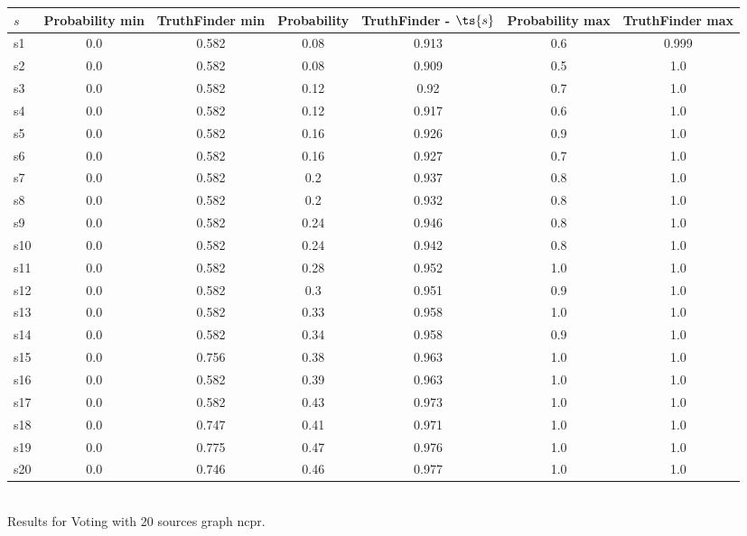 \documentclass{article}
\begin{document}
\noindent\begin{tabular}{|l|c|c|c|c|c|c|}
\hline
$s$& Probability min & TruthFinder min & Probability & TruthFinder - $\ts{s}$ & Probability max & TruthFinder max\\
\hline
s1 &0.0 & 0.582 & 0.08 & 0.913 & 0.6 & 0.999\\
\hline
s2 &0.0 & 0.582 & 0.08 & 0.909 & 0.5 & 1.0\\
\hline
s3 &0.0 & 0.582 & 0.12 & 0.92 & 0.7 & 1.0\\
\hline
s4 &0.0 & 0.582 & 0.12 & 0.917 & 0.6 & 1.0\\
\hline
s5 &0.0 & 0.582 & 0.16 & 0.926 & 0.9 & 1.0\\
\hline
s6 &0.0 & 0.582 & 0.16 & 0.927 & 0.7 & 1.0\\
\hline
s7 &0.0 & 0.582 & 0.2 & 0.937 & 0.8 & 1.0\\
\hline
s8 &0.0 & 0.582 & 0.2 & 0.932 & 0.8 & 1.0\\
\hline
s9 &0.0 & 0.582 & 0.24 & 0.946 & 0.8 & 1.0\\
\hline
s10 &0.0 & 0.582 & 0.24 & 0.942 & 0.8 & 1.0\\
\hline
s11 &0.0 & 0.582 & 0.28 & 0.952 & 1.0 & 1.0\\
\hline
s12 &0.0 & 0.582 & 0.3 & 0.951 & 0.9 & 1.0\\
\hline
s13 &0.0 & 0.582 & 0.33 & 0.958 & 1.0 & 1.0\\
\hline
s14 &0.0 & 0.582 & 0.34 & 0.958 & 0.9 & 1.0\\
\hline
s15 &0.0 & 0.756 & 0.38 & 0.963 & 1.0 & 1.0\\
\hline
s16 &0.0 & 0.582 & 0.39 & 0.963 & 1.0 & 1.0\\
\hline
s17 &0.0 & 0.582 & 0.43 & 0.973 & 1.0 & 1.0\\
\hline
s18 &0.0 & 0.747 & 0.41 & 0.971 & 1.0 & 1.0\\
\hline
s19 &0.0 & 0.775 & 0.47 & 0.976 & 1.0 & 1.0\\
\hline
s20 &0.0 & 0.746 & 0.46 & 0.977 & 1.0 & 1.0\\
\hline
\end{tabular}\\

\noindent Results for Voting with 20 sources graph ncpr.
\end{document}

